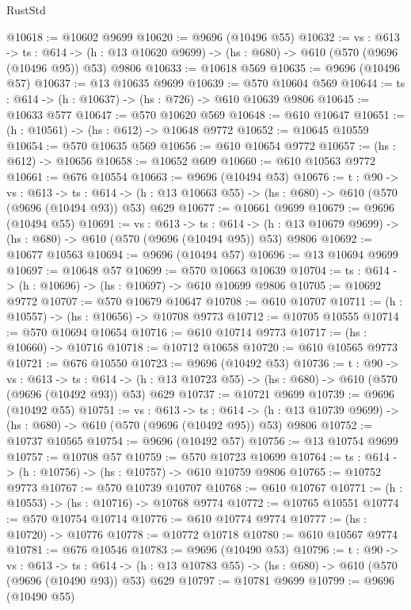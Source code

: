\begin{lexlean}{RustStd}
\begin{coremodule}
@10618 := @10602 @9699
@10620 := @9696 (@10496 @55)
@10632 := {vs : @613} ->
  {ts : @614} -> (h : @13 @10620 @9699) -> (hs : @680) -> @610 (@570 (@9696 (@10496 @95)) @53) @9806
@10633 := @10618 @569
@10635 := @9696 (@10496 @57)
@10637 := @13 @10635 @9699
@10639 := @570 @10604 @569
@10644 := {ts : @614} -> (h : @10637) -> (hs : @726) -> @610 @10639 @9806
@10645 := @10633 @577
@10647 := @570 @10620 @569
@10648 := @610 @10647
@10651 := (h : @10561) -> (hs : @612) -> @10648 @9772
@10652 := @10645 @10559
@10654 := @570 @10635 @569
@10656 := @610 @10654 @9772
@10657 := (hs : @612) -> @10656
@10658 := @10652 @609
@10660 := @610 @10563 @9772
@10661 := @676 @10554
@10663 := @9696 (@10494 @53)
@10676 := {t : @90} ->
  {vs : @613} ->
  {ts : @614} -> (h : @13 @10663 @55) -> (hs : @680) -> @610 (@570 (@9696 (@10494 @93)) @53) @629
@10677 := @10661 @9699
@10679 := @9696 (@10494 @55)
@10691 := {vs : @613} ->
  {ts : @614} -> (h : @13 @10679 @9699) -> (hs : @680) -> @610 (@570 (@9696 (@10494 @95)) @53) @9806
@10692 := @10677 @10563
@10694 := @9696 (@10494 @57)
@10696 := @13 @10694 @9699
@10697 := @10648 @57
@10699 := @570 @10663 @10639
@10704 := {ts : @614} -> (h : @10696) -> (hs : @10697) -> @610 @10699 @9806
@10705 := @10692 @9772
@10707 := @570 @10679 @10647
@10708 := @610 @10707
@10711 := (h : @10557) -> (hs : @10656) -> @10708 @9773
@10712 := @10705 @10555
@10714 := @570 @10694 @10654
@10716 := @610 @10714 @9773
@10717 := (hs : @10660) -> @10716
@10718 := @10712 @10658
@10720 := @610 @10565 @9773
@10721 := @676 @10550
@10723 := @9696 (@10492 @53)
@10736 := {t : @90} ->
  {vs : @613} ->
  {ts : @614} -> (h : @13 @10723 @55) -> (hs : @680) -> @610 (@570 (@9696 (@10492 @93)) @53) @629
@10737 := @10721 @9699
@10739 := @9696 (@10492 @55)
@10751 := {vs : @613} ->
  {ts : @614} -> (h : @13 @10739 @9699) -> (hs : @680) -> @610 (@570 (@9696 (@10492 @95)) @53) @9806
@10752 := @10737 @10565
@10754 := @9696 (@10492 @57)
@10756 := @13 @10754 @9699
@10757 := @10708 @57
@10759 := @570 @10723 @10699
@10764 := {ts : @614} -> (h : @10756) -> (hs : @10757) -> @610 @10759 @9806
@10765 := @10752 @9773
@10767 := @570 @10739 @10707
@10768 := @610 @10767
@10771 := (h : @10553) -> (hs : @10716) -> @10768 @9774
@10772 := @10765 @10551
@10774 := @570 @10754 @10714
@10776 := @610 @10774 @9774
@10777 := (hs : @10720) -> @10776
@10778 := @10772 @10718
@10780 := @610 @10567 @9774
@10781 := @676 @10546
@10783 := @9696 (@10490 @53)
@10796 := {t : @90} ->
  {vs : @613} ->
  {ts : @614} -> (h : @13 @10783 @55) -> (hs : @680) -> @610 (@570 (@9696 (@10490 @93)) @53) @629
@10797 := @10781 @9699
@10799 := @9696 (@10490 @55)

\end{coremodule}
\end{lexlean}
